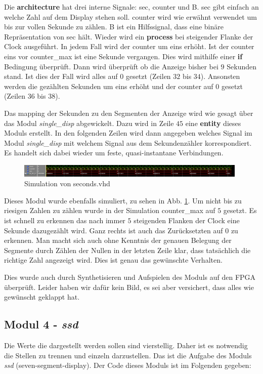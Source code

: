 Die \textbf{architecture} hat drei interne Signale: sec, counter und B.
sec gibt einfach an welche Zahl auf dem Display stehen soll.
counter wird wie erwähnt verwendet um bis zur vollen Sekunde zu zählen.
B ist ein Hilfssignal, dass eine binäre Repräsentation von sec hält.
Wieder wird ein \textbf{process} bei steigender Flanke der Clock ausgeführt.
In jedem Fall wird der counter um eins erhöht.
Ist der counter eins vor counter\_max ist eine Sekunde vergangen.
Dies wird mithilfe einer \textbf{if} Bedingung überprüft.
Dann wird überprüft ob die Anzeige bisher bei $9$ Sekunden stand.
Ist dies der Fall wird alles auf $0$ gesetzt (Zeilen $32$ bis $34$).
Ansonsten werden die gezählten Sekunden um eins erhöht und der counter auf $0$ gesetzt (Zeilen $36$ bis $38$).

Das mapping der Sekunden zu den Segmenten der Anzeige wird wie gesagt über das Modul \textit{single\_disp} abgewickelt.
Dazu wird in Zeile $45$ eine \textbf{entity} dieses Moduls erstellt.
In den folgenden Zeilen wird dann angegeben welches Signal im Modul \textit{single\_disp} mit welchem Signal aus dem Sekundenzähler korrespondiert.
Es handelt sich dabei wieder um feste, quasi-instantane Verbindungen.

\begin{figure}[ht]
	\centering
    \includegraphics[width=0.98\textwidth]{../Daten/seconds2.png}
	\caption{Simulation von seconds.vhd}
	\label{img_seconds}
\end{figure}

Dieses Modul wurde ebenfalls simuliert, zu sehen in Abb. \ref{img_seconds}.
Um nicht bis zu riesigen Zahlen zu zählen wurde in der Simulation counter\_max auf $5$ gesetzt.
Es ist schnell zu erkennen das nach immer $5$ steigenden Flanken der Clock eine Sekunde dazugezählt wird.
Ganz rechts ist auch das Zurücksetzten auf $0$ zu erkennen.
Man macht sich auch ohne Kenntnis der genauen Belegung der Segmente durch Zählen der Nullen in der letzten Zeile klar, dass tatsächlich die richtige Zahl angezeigt wird.
Dies ist genau das gewünschte Verhalten.

Dies wurde auch durch Synthetisieren und Aufspielen des Moduls auf den FPGA überprüft.
Leider haben wir dafür kein Bild, es sei aber versichert, dass alles wie gewünscht geklappt hat.

\subsection{Modul 4 - \textit{ssd}}
Die Werte die dargestellt werden sollen sind vierstellig.
Daher ist es notwendig die Stellen zu trennen und einzeln darzustellen.
Das ist die Aufgabe des Moduls \textit{ssd} (seven-segment-display). Der Code dieses Moduls ist im Folgenden gegeben:

